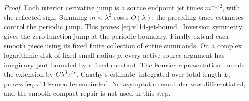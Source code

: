 \documentclass[11pt]{article}
\theoremstyle{remark}
\begin{document}
\begin{proof}
Each interior derivative jump is a source endpoint jet times
$m^{-1/2}$, with the reflected sign. Summing $m<\lambda^2$ costs
$O(\lambda)$; the preceding trace estimates control the periodic jump.
This proves \eqref{eq:v114-jet-bound}. Inversion symmetry gives the zero
function jump at the periodic boundary.
Finally extend each smooth piece using its fixed finite collection of
entire summands. On a complex logarithmic disk of fixed small radius
$\rho$, every active source argument has imaginary part bounded by a
fixed constant. The Fourier representation bounds the extension by
$C\lambda^3e^{Ac}$. Cauchy's estimate, integrated over total length $L$,
proves \eqref{eq:v114-smooth-remainder}. No asymptotic remainder was
differentiated, and the smooth compact repair is not used in this step.
\end{proof}
\end{document}
